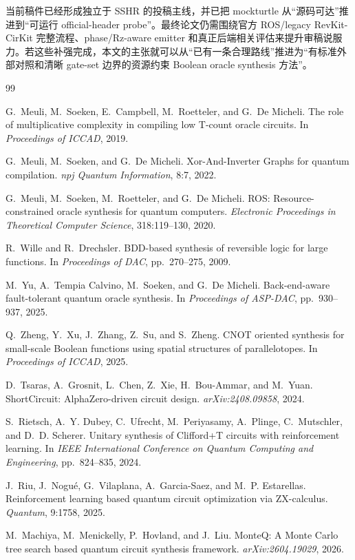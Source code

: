 \documentclass[UTF8,fontset=macnew,11pt]{ctexart}
\begin{document}
当前稿件已经形成独立于 SSHR 的投稿主线，并已把 mockturtle 从“源码可达”推进到“可运行 official-header probe”。最终论文仍需围绕官方 ROS/legacy RevKit-CirKit 完整流程、phase/Rz-aware emitter 和真正后端相关评估来提升审稿说服力。若这些补强完成，本文的主张就可以从“已有一条合理路线”推进为“有标准外部对照和清晰 gate-set 边界的资源约束 Boolean oracle synthesis 方法”。

\begin{thebibliography}{99}

G.~Meuli, M.~Soeken, E.~Campbell, M.~Roetteler, and G.~De Micheli.
\newblock The role of multiplicative complexity in compiling low T-count oracle circuits.
\newblock In \emph{Proceedings of ICCAD}, 2019.

G.~Meuli, M.~Soeken, and G.~De Micheli.
\newblock Xor-And-Inverter Graphs for quantum compilation.
\newblock \emph{npj Quantum Information}, 8:7, 2022.

G.~Meuli, M.~Soeken, M.~Roetteler, and G.~De Micheli.
\newblock ROS: Resource-constrained oracle synthesis for quantum computers.
\newblock \emph{Electronic Proceedings in Theoretical Computer Science}, 318:119--130, 2020.

R.~Wille and R.~Drechsler.
\newblock BDD-based synthesis of reversible logic for large functions.
\newblock In \emph{Proceedings of DAC}, pp.~270--275, 2009.

M.~Yu, A.~Tempia Calvino, M.~Soeken, and G.~De Micheli.
\newblock Back-end-aware fault-tolerant quantum oracle synthesis.
\newblock In \emph{Proceedings of ASP-DAC}, pp.~930--937, 2025.

Q.~Zheng, Y.~Xu, J.~Zhang, Z.~Su, and S.~Zheng.
\newblock CNOT oriented synthesis for small-scale Boolean functions using spatial structures of parallelotopes.
\newblock In \emph{Proceedings of ICCAD}, 2025.

D.~Tsaras, A.~Grosnit, L.~Chen, Z.~Xie, H.~Bou-Ammar, and M.~Yuan.
\newblock ShortCircuit: AlphaZero-driven circuit design.
\newblock \emph{arXiv:2408.09858}, 2024.

S.~Rietsch, A.~Y. Dubey, C.~Ufrecht, M.~Periyasamy, A.~Plinge, C.~Mutschler, and D.~D. Scherer.
\newblock Unitary synthesis of Clifford+T circuits with reinforcement learning.
\newblock In \emph{IEEE International Conference on Quantum Computing and Engineering}, pp.~824--835, 2024.

J.~Riu, J.~Nogu{\'e}, G.~Vilaplana, A.~Garcia-Saez, and M.~P. Estarellas.
\newblock Reinforcement learning based quantum circuit optimization via ZX-calculus.
\newblock \emph{Quantum}, 9:1758, 2025.

M.~Machiya, M.~Menickelly, P.~Hovland, and J.~Liu.
\newblock MonteQ: A Monte Carlo tree search based quantum circuit synthesis framework.
\newblock \emph{arXiv:2604.19029}, 2026.

\end{thebibliography}
\end{document}
